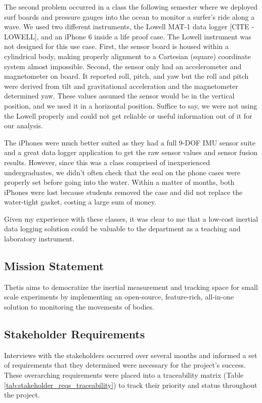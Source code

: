 The second problem occurred in a class the following semester where we deployed surf boards and pressure gauges into the ocean to monitor a surfer's ride along a wave.
We used two different instruments, the Lowell MAT-1 data logger [CITE - LOWELL], and an iPhone 6 inside a life proof case.
The Lowell instrument was not designed for this use case.
First, the sensor board is housed within a cylindrical body, making properly alignment to a Cartesian (square) coordinate system almost impossible.
Second, the sensor only had an accelerometer and magnetometer on board.
It reported roll, pitch, and yaw but the roll and pitch were derived from tilt and gravitational acceleration and the magnetometer determined yaw.
These values assumed the sensor would be in the vertical position, and we used it in a horizontal position.
Suffice to say, we were not using the Lowell properly and could not get reliable or useful information out of it for our analysis.

The iPhones were much better suited as they had a full 9-DOF IMU sensor suite and a great data logger application to get the raw sensor values and sensor fusion results.
However, since this was a class comprised of inexperienced undergraduates, we didn't often check that the seal on the phone cases were properly set before going into the water.
Within a matter of months, both iPhones were lost because students removed the case and did not replace the water-tight gasket, costing a large sum of money.

Given my experience with these classes, it was clear to me that a low-cost inertial data logging solution could be valuable to the department as a teaching and laboratory instrument.

\subsection{Mission Statement} \label{ssec:mission_statement}
Thetis aims to democratize the inertial measurement and tracking space for small scale experiments by implementing an open-source, feature-rich, all-in-one solution to monitoring the movements of bodies.

\subsection{Stakeholder Requirements} \label{ssec:stakeholder_reqs}
Interviews with the stakeholders occurred over several months and informed a set of requirements that they determined were necessary for the project's success.
These overarching requirements were placed into a traceability matrix (Table \ref{tab:stakeholder_reqs_traceability}) to track their priority and status throughout the project.


